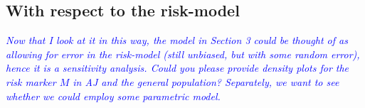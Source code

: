 \documentclass[11pt, letterpaper]{article}
\begin{document}
\subsection{With respect to the risk-model}

\textcolor{blue}{\it Now that I look at it in this way, the model in Section 3 could be thought of as allowing for error in the risk-model (still unbiased, but with some random error), hence it is a sensitivity analysis. Could you please provide density plots for the risk marker $M$ in AJ and the general population? Separately, we want to see whether we could employ some parametric model.}

% 
% 
% 
\end{document}
